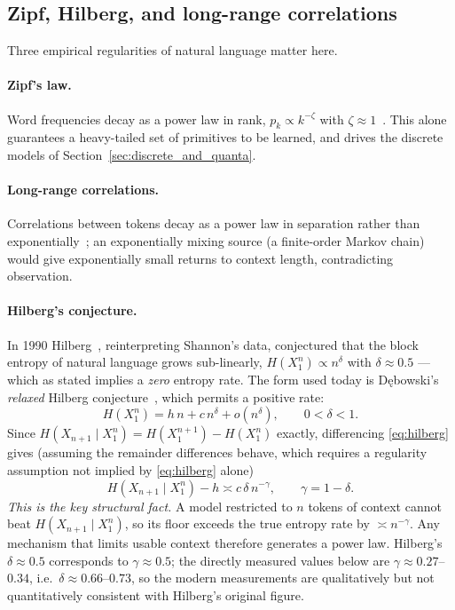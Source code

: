 \documentclass[11pt,a4paper]{article}
\theoremstyle{definition}
\begin{document}
\subsection{Zipf, Hilberg, and long-range correlations}

Three empirical regularities of natural language matter here.

\paragraph{Zipf's law.} Word frequencies decay as a power law in rank, $p_k \propto k^{-\zeta}$ with $\zeta\approx 1$~\cite{zipf1949human}. This alone guarantees a heavy-tailed set of primitives to be learned, and drives the discrete models of Section~\ref{sec:discrete_and_quanta}.

\paragraph{Long-range correlations.} Correlations between tokens decay as a power law in separation rather than exponentially~\cite{ebeling1994entropy,lin2017critical}; an exponentially mixing source (a finite-order Markov chain) would give exponentially small returns to context length, contradicting observation.

\paragraph{Hilberg's conjecture.} In 1990 Hilberg~\cite{hilberg1990der}, reinterpreting Shannon's data, conjectured that the block entropy of natural language grows sub-linearly, $H(X_1^n)\propto n^{\delta}$ with $\delta\approx 0.5$ --- which as stated implies a \emph{zero} entropy rate. The form used today is D\k{e}bowski's \emph{relaxed} Hilberg conjecture~\cite{debowski2015relaxed,debowski2021book}, which permits a positive rate:
\begin{equation}
  H(X_1^n) = h\,n + c\,n^{\delta} + o(n^{\delta}), \qquad 0<\delta<1 .
  \label{eq:hilberg}
\end{equation}
Since $H(X_{n+1}\mid X_1^n) = H(X_1^{n+1}) - H(X_1^n)$ exactly, differencing \eqref{eq:hilberg} gives (assuming the remainder differences behave, which requires a regularity assumption not implied by \eqref{eq:hilberg} alone)
\begin{equation}
  H(X_{n+1}\mid X_1^n) - h \asymp c\,\delta\, n^{-\gamma}, \qquad \gamma = 1-\delta .
  \label{eq:entropy-decay}
\end{equation}
\emph{This is the key structural fact.} A model restricted to $n$ tokens of context cannot beat $H(X_{n+1}\mid X_1^n)$, so its floor exceeds the true entropy rate by $\asymp n^{-\gamma}$. Any mechanism that limits usable context therefore generates a power law. Hilberg's $\delta\approx 0.5$ corresponds to $\gamma\approx 0.5$; the directly measured values below are $\gamma\approx 0.27$--$0.34$, i.e.\ $\delta\approx 0.66$--$0.73$, so the modern measurements are qualitatively but not quantitatively consistent with Hilberg's original figure.
\end{document}
